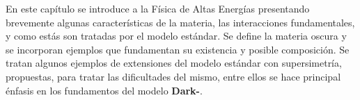 %


En este capítulo se introduce a la Física de Altas Energías presentando brevemente algunas características de la materia, las interacciones fundamentales, y como estás son tratadas por el modelo estándar. Se define la materia oscura y se incorporan ejemplos que fundamentan su existencia y posible composición.
Se tratan algunos ejemplos de extensiones del modelo estándar con supersimetría, propuestas, para tratar las dificultades del mismo, entre ellos se hace principal énfasis en los fundamentos del modelo \textbf{Dark-}\SUSY.





